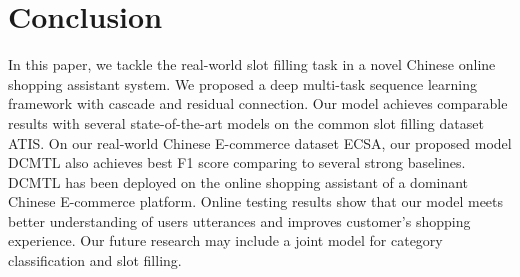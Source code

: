 \section{Conclusion}
\label{sec:conclusion}
In this paper, we tackle the real-world slot filling task 
in a novel Chinese online shopping assistant system. 
We proposed a deep multi-task sequence learning framework with 
cascade and residual connection. 
Our model achieves comparable results with 
several state-of-the-art models on the common slot filling dataset ATIS. 
On our real-world Chinese E-commerce dataset ECSA, 
our proposed model DCMTL also achieves best F1 score comparing 
to several strong baselines.
DCMTL has been deployed on the online shopping assistant of a dominant
Chinese E-commerce platform.
Online testing results show that our model meets better understanding of users utterances
and improves customer’s shopping experience.
Our future research may include a joint model for category classification and slot filling. 


